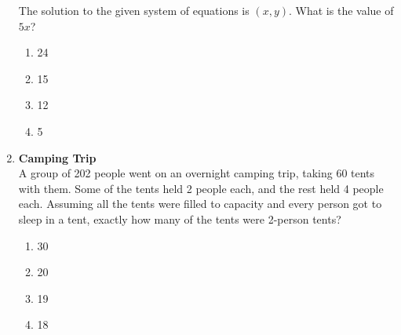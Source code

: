 \begin{enumerate}
The solution to the given system of equations is $(x, y)$. What is the value of $5x$?
\begin{enumerate}[label=(\Alph*)]
  \item 24
  \item 15
  \item 12
  \item 5
\end{enumerate}
\begin{subanswer}
\end{subanswer}

\item \textbf{Camping Trip}\\
A group of 202 people went on an overnight camping trip, taking 60 tents with them. Some of the tents held 2 people each, and the rest held 4 people each. Assuming all the tents were filled to capacity and every person got to sleep in a tent, exactly how many of the tents were 2-person tents?
\begin{enumerate}[label=(\Alph*)]
  \item 30
  \item 20
  \item 19
  \item 18
\end{enumerate}
\begin{subanswer}
\end{subanswer}

\end{enumerate}








